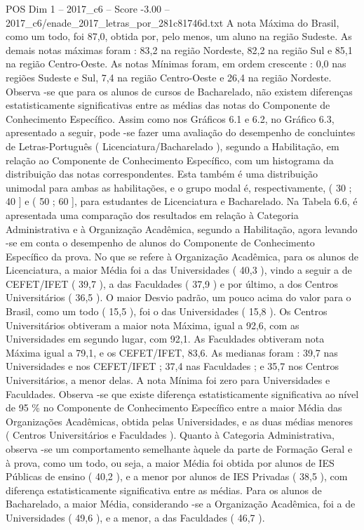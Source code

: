 \begin{textsample}{POS Dim 1 – 2017\_c6 – Score -3.00 – 2017\_c6/enade\_2017\_letras\_por\_281c81746d.txt}
A nota Máxima do Brasil, como um todo, foi 87,0, obtida por, pelo menos, um aluno na região Sudeste.
As demais notas máximas foram : 83,2 na região Nordeste, 82,2 na região Sul e 85,1 na região Centro-Oeste.
As notas Mínimas foram, em ordem crescente : 0,0 nas regiões Sudeste e Sul, 7,4 na região Centro-Oeste e 26,4 na região Nordeste.
Observa -se que para os alunos de cursos de Bacharelado, não existem diferenças estatisticamente significativas entre as médias das notas do Componente de Conhecimento Específico.
Assim como nos Gráficos 6.1 e 6.2, no Gráfico 6.3, apresentado a seguir, pode -se fazer uma avaliação do desempenho de concluintes de Letras-Português ( Licenciatura/Bacharelado ), segundo a Habilitação, em relação ao Componente de Conhecimento Específico, com um histograma da distribuição das notas correspondentes.
Esta também é uma distribuição unimodal para ambas as habilitações, e o grupo modal é, respectivamente, ( 30 ; 40 ] e ( 50 ; 60 ], para estudantes de Licenciatura e Bacharelado.
Na Tabela 6.6, é apresentada uma comparação dos resultados em relação à Categoria Administrativa e à Organização Acadêmica, segundo a Habilitação, agora levando -se em conta o desempenho de alunos do Componente de Conhecimento Específico da prova.
No que se refere à Organização Acadêmica, para os alunos de Licenciatura, a maior Média foi a das Universidades ( 40,3 ), vindo a seguir a de CEFET/IFET ( 39,7 ), a das Faculdades ( 37,9 ) e por último, a dos Centros Universitários ( 36,5 ).
O maior Desvio padrão, um pouco acima do valor para o Brasil, como um todo ( 15,5 ), foi o das Universidades ( 15,8 ).
Os Centros Universitários obtiveram a maior nota Máxima, igual a 92,6, com as Universidades em segundo lugar, com 92,1.
As Faculdades obtiveram nota Máxima igual a 79,1, e os CEFET/IFET, 83,6.
As medianas foram : 39,7 nas Universidades e nos CEFET/IFET ; 37,4 nas Faculdades ; e 35,7 nos Centros Universitários, a menor delas.
A nota Mínima foi zero para Universidades e Faculdades.
Observa -se que existe diferença estatisticamente significativa ao nível de 95 \% no Componente de Conhecimento Específico entre a maior Média das Organizações Acadêmicas, obtida pelas Universidades, e as duas médias menores ( Centros Universitários e Faculdades ).
Quanto à Categoria Administrativa, observa -se um comportamento semelhante àquele da parte de Formação Geral e à prova, como um todo, ou seja, a maior Média foi obtida por alunos de IES Públicas de ensino ( 40,2 ), e a menor por alunos de IES Privadas ( 38,5 ), com diferença estatisticamente significativa entre as médias.
Para os alunos de Bacharelado, a maior Média, considerando -se a Organização Acadêmica, foi a de Universidades ( 49,6 ), e a menor, a das Faculdades ( 46,7 ).

\end{textsample}
